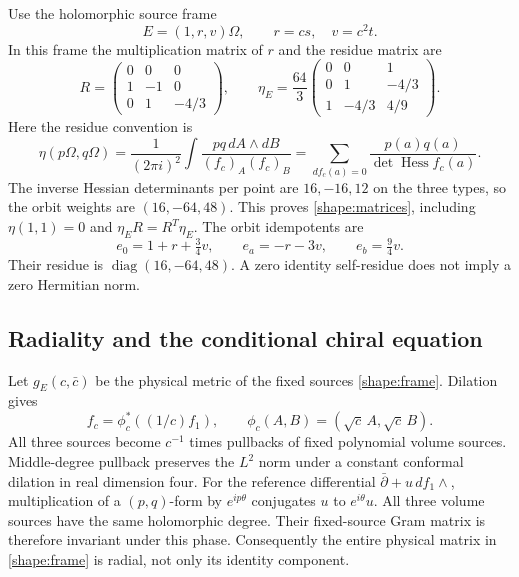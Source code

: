 Use the holomorphic source frame
\begin{equation}\label{shape:frame}
E=(1,r,v)\Omega,\qquad r=cs,\quad v=c^2t.
\end{equation}
In this frame the multiplication matrix of $r$ and the residue matrix are
\begin{equation}\label{shape:matrices}
R=\begin{pmatrix}0&0&0\\1&-1&0\\0&1&-4/3\end{pmatrix},
\qquad
\eta_E=\frac{64}{3}
\begin{pmatrix}0&0&1\\0&1&-4/3\\1&-4/3&4/9\end{pmatrix}.
\end{equation}
Here the residue convention is
\[
\eta(p\Omega,q\Omega)=\frac1{(2\pi i)^2}\int
\frac{pq\,dA\wedge dB}{(f_c)_A(f_c)_B}
=\sum_{df_c(a)=0}\frac{p(a)q(a)}{\det\operatorname{Hess}f_c(a)} .
\]
The inverse Hessian determinants per point are $16,-16,12$ on the
three types, so the orbit weights are $(16,-64,48)$. This proves
\eqref{shape:matrices}, including $\eta(1,1)=0$ and
$\eta_E R=R^T\eta_E$. The orbit idempotents are
\begin{equation}\label{shape:idempotents}
e_0=1+r+\tfrac34v,\qquad e_a=-r-3v,\qquad e_b=\tfrac94v.
\end{equation}
Their residue is $\operatorname{diag}(16,-64,48)$. A zero identity
self-residue does not imply a zero Hermitian norm.

\subsection{Radiality and the conditional chiral equation}
Let $g_E(c,\bar c)$ be the physical metric of the fixed sources
\eqref{shape:frame}. Dilation gives
\[
f_c=\phi_c^*((1/c)f_1),\qquad
\phi_c(A,B)=(\sqrt c\,A,\sqrt c\,B).
\]
All three sources become $c^{-1}$ times pullbacks of fixed polynomial
volume sources. Middle-degree pullback preserves the $L^2$ norm
under a constant conformal dilation in real dimension four. For the
reference differential $\bar\partial+u\,df_1\wedge$, multiplication
of a $(p,q)$-form by $e^{ip\theta}$ conjugates $u$ to $e^{i\theta}u$.
All three volume sources have the same holomorphic degree. Their
fixed-source Gram matrix is therefore invariant under this phase.
Consequently the entire physical matrix in \eqref{shape:frame} is
radial, not only its identity component.

